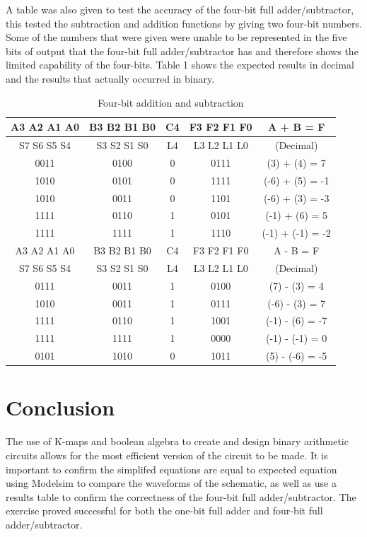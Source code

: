 \documentclass[CMPE]{KGCOEReport}
\begin{document}
A table was also given to test the accuracy of the four-bit full adder/subtractor, this tested the subtraction and addition functions by giving two four-bit numbers. Some of the numbers that were given were unable to be represented in the five bits of output that the four-bit full adder/subtractor has and therefore shows the limited capability of the four-bits. Table 1 shows the expected results in decimal and the results that actually occurred in binary.

\begin{table}[H]
	\centering
	\caption{Four-bit addition and subtraction}
	\label{tab: Table 1}
	\begin{tabular}{|c|c||c||c||c|}
		\hline
		A3 A2 A1 A0 & B3 B2 B1 B0 & C4 & F3 F2 F1 F0 & A + B = F\\ \hline
		S7 S6 S5 S4 & S3 S2 S1 S0 & L4 & L3 L2 L1 L0 & (Decimal)\\ \hline
		0011 & 0100 & 0 & 0111 & (3) + (4) = 7\\ \hline
		1010 & 0101 & 0 & 1111 & (-6) + (5) = -1\\ \hline
		1010 & 0011 & 0 & 1101 & (-6) + (3) = -3\\ \hline
		1111 & 0110 & 1 & 0101 & (-1) + (6) = 5\\ \hline
		1111 & 1111 & 1 & 1110 & (-1) + (-1) = -2\\ \hline
		A3 A2 A1 A0 & B3 B2 B1 B0 & C4 & F3 F2 F1 F0 & A - B = F\\ \hline
		S7 S6 S5 S4 & S3 S2 S1 S0 & L4 & L3 L2 L1 L0 & (Decimal)\\ \hline
		0111 & 0011 & 1 & 0100 & (7) - (3) = 4\\ \hline
		1010 & 0011 & 1 & 0111 & (-6) - (3) = 7\\ \hline
		1111 & 0110 & 1 & 1001 & (-1) - (6) = -7\\ \hline
		1111 & 1111 & 1 & 0000 & (-1) - (-1) = 0\\ \hline
		0101 & 1010 & 0 & 1011 & (5) - (-6) = -5\\ \hline
		\hline
	\end{tabular}
\end{table}	

\section*{Conclusion}

The use of K-maps and boolean algebra to create and design binary arithmetic circuits allows for the most efficient version of the circuit to be made. It is important to confirm the simplifed equations are equal to expected equation using Modelsim to compare the waveforms of the schematic, as well as use a results table to confirm the correctness of the four-bit full adder/subtractor. The exercise proved successful for both the one-bit full adder and four-bit full adder/subtractor.
\end{document}
